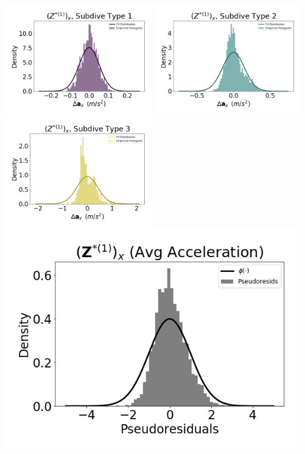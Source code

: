 \documentclass[12pt]{TD-CJS}
\begin{document}
\includegraphics[width=2.5in]{../Plots/HHMM_empirical_hist_Ax_0.png}
\includegraphics[width=2.5in]{../Plots/HHMM_empirical_hist_Ax_1.png}
\includegraphics[width=2.5in]{../Plots/HHMM_empirical_hist_Ax_2.png}
\includegraphics[width=5in]{../Plots/HHMM_psedoresids_Ax.png}
\end{document}
